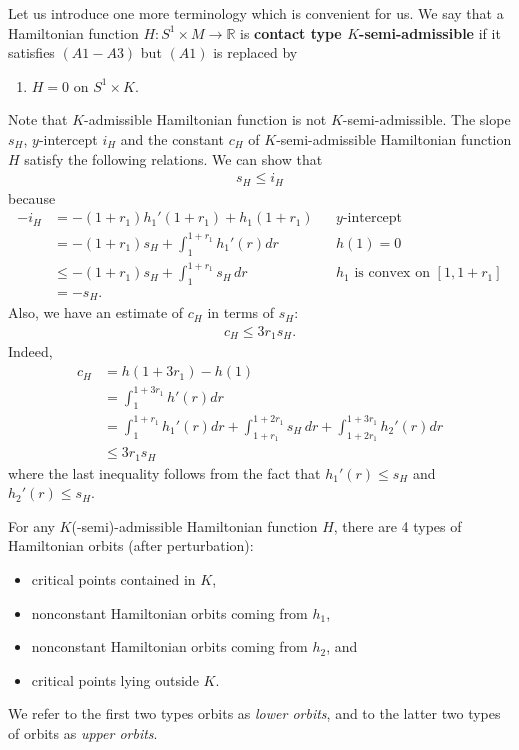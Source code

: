 \documentclass[12pt]{amsart}
\theoremstyle{definition}
\newcommand{\RR}{{\mathbb R}}
\begin{document}
\vspace{0.2 cm}
 
Let us introduce one more terminology which is convenient for us. We say that a Hamiltonian function $H : S^1 \times M \to \RR$ is \textbf{contact type $K$-semi-admissible} if it satisfies $(A1-A3)$ but $(A1)$ is replaced by\vspace{0.2 cm}
 \begin{enumerate}[label=(A1$^{'}$)]
     \item $H = 0$ on $S^1 \times K$.\vspace{0.2 cm}
 \end{enumerate}
Note that $K$-admissible Hamiltonian function is not $K$-semi-admissible. The slope $s_H$, $y$-intercept $i_H$ and the constant $c_H$ of $K$-semi-admissible Hamiltonian function $H$ satisfy the following relations. We can show that 
\begin{align*}
    s_H \leq i_H
\end{align*}
because
\begin{align*}
    -i_H &= -(1+r_1)h_1'(1+r_1) + h_1(1+r_1)&&y\textrm{-intercept}\\
    &=-(1+r_1)s_H + \int_{1}^{1+r_1} h_1'(r) dr &&h(1)=0\\
    &\leq -(1+r_1)s_H + \int_{1}^{1+r_1} s_H\, dr&&h_1\,\,\textrm{is convex on}\,\,[1,1+r_1]\\
    &=-s_H.
\end{align*}
Also, we have an estimate of $c_H$ in terms of $s_H$:
\begin{align}\label{chsh}
    c_H \leq 3r_1 s_H.
\end{align}
Indeed, 
\begin{align*}
    c_H &= h(1+3r_1) - h(1) \\
    &=\int_{1}^{1+3r_1} h'(r) dr \\
    &=\int_{1}^{1+r_1} h_1'(r)dr+ \int_{1+r_1}^{1+2r_1}s_H\,dr+ \int_{1+2r_1}^{1+3r_1}h_2'(r)dr \\
    &\leq3r_1 s_H
\end{align*}
where the last inequality follows from the fact that $h_1'(r) \leq s_H$ and $h_2'(r) \leq s_H$.

\vspace{0.2cm}

For any $K$(-semi)-admissible Hamiltonian function $H$, there are 4 types of Hamiltonian orbits (after perturbation): 
\begin{itemize}
    \item critical points contained in $K$,\vspace{0.2 cm}
    \item nonconstant Hamiltonian orbits coming from $h_1$,\vspace{0.2 cm}
    \item nonconstant Hamiltonian orbits coming from $h_2$, and\vspace{0.2 cm}
    \item critical points lying outside $K$.\vspace{0.2 cm}
\end{itemize}
We refer to the first two types orbits as \textit{lower orbits}, and to the latter two types of orbits as \textit{upper orbits}. 
\end{document}
